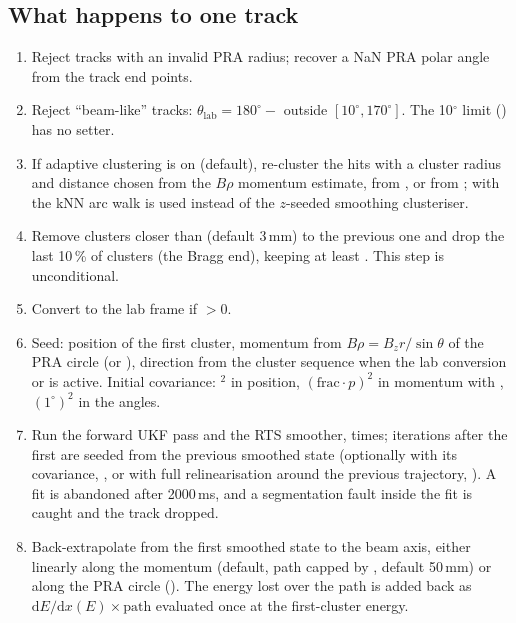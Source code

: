 \subsection{What happens to one track}

\begin{enumerate}
\item Reject tracks with an invalid PRA radius; recover a NaN PRA polar angle from the track end points.
\item Reject ``beam-like'' tracks: $\theta_\mathrm{lab} = 180^\circ - $  outside
  $[10^\circ, 170^\circ]$. The 10$^\circ$ limit () has no setter.
\item If adaptive clustering is on (default), re-cluster the hits with a cluster radius and distance chosen from the
  $B\rho$ momentum estimate, from , or from ; with
   the kNN arc walk is used instead of the $z$-seeded smoothing clusteriser.
\item Remove clusters closer than  (default 3\,mm) to the previous one and drop the last
  10\,\% of clusters (the Bragg end), keeping at least . This step is unconditional.
\item Convert to the lab frame if  $>0$.
\item Seed: position of the first cluster, momentum from $B\rho = B_z r/\sin\theta$ of the PRA circle (or
  ), direction from the cluster sequence when the lab conversion or
   is active. Initial covariance: $^2$ in position,
  $(\mathrm{frac}\cdot p)^2$ in momentum with , $(1^\circ)^2$ in the angles.
\item Run the forward UKF pass and the RTS smoother,  times; iterations after the first are
  seeded from the previous smoothed state (optionally with its covariance, , or with full
  relinearisation around the previous trajectory, ). A fit is abandoned after 2000\,ms, and a
  segmentation fault inside the fit is caught and the track dropped.
\item Back-extrapolate from the first smoothed state to the beam axis, either linearly along the momentum
  (default, path capped by , default 50\,mm) or along the PRA circle
  (). The energy lost over the path is added back as $\mathrm{d}E/\mathrm{d}x(E)\times
  \mathrm{path}$ evaluated once at the first-cluster energy.
\end{enumerate}

